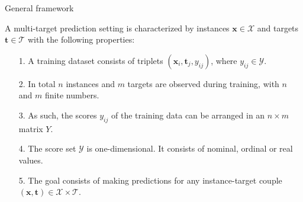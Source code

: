 \documentclass[]{beamer}
\renewcommand{\vec}[1]{\boldsymbol{#1}}
\newcommand{\bx}{\boldsymbol{x}}
\newcommand{\by}{\boldsymbol{y}}
\newcommand{\bh}{\boldsymbol{h}}
\renewcommand{\emph}[1]{\textbf{\color{putblue}#1}}
\begin{document}
%

\begin{frame}{General framework}

\begin{definition}
A multi-target prediction setting is characterized by instances $\vec{x} \in \mathcal{X}$ and targets $\vec{t} \in \mathcal{T}$ with the following properties: 
\begin{itemize} 
\item[1.] A training dataset consists of triplets $(\vec{x}_i,\vec{t}_j,y_{ij})$, where $y_{ij} \in \mathcal{Y}$.  
\item[2.] In total $n$ instances and $m$ targets are observed during training, with $n$ and $m$ finite numbers. 
\item[3.]As such, the scores $y_{ij}$ of the training data can be arranged in an $n \times m$ matrix $Y$.
\item[4.] The score set $\mathcal{Y}$ is one-dimensional. It consists of nominal, ordinal or real values.  
\item[5.] The goal consists of making predictions for any instance-target couple $(\vec{x},\vec{t}) \in \mathcal{X} \times \mathcal{T}$.   
\end{itemize}
\end{definition}

\end{frame}
\end{document}
